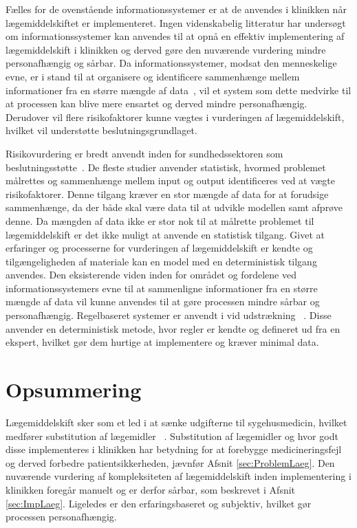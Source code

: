Fælles for de ovenstående informationssystemer er at de anvendes i klinikken når lægemiddelskiftet er implementeret. Ingen videnskabelig litteratur har undersøgt om informationssystemer kan anvendes til at opnå en effektiv implementering af lægemiddelskift i klinikken og derved gøre den nuværende vurdering mindre personafhængig og sårbar. Da informationssystemer, modsat den menneskelige evne, er i stand til at organisere og identificere sammenhænge mellem informationer fra en større mængde af data~\citep{Agrawal2009}, vil et system som dette medvirke til at processen kan blive mere ensartet og derved mindre personafhængig. Derudover vil flere risikofaktorer kunne vægtes i vurderingen af lægemiddelskift, hvilket vil understøtte beslutningsgrundlaget.  

Risikovurdering er bredt anvendt inden for sundhedssektoren som beslutningsstøtte~\citep{Geissert2018}. De fleste studier anvender statistisk, hvormed problemet målrettes og sammenhænge mellem input og output identificeres ved at vægte risikofaktorer. Denne tilgang kræver en stor mængde af data for at forudsige sammenhænge, da der både skal være data til at udvikle modellen samt afprøve denne. Da mængden af data ikke er stor nok til at målrette problemet til lægemiddelskift er det ikke muligt at anvende en statistisk tilgang. Givet at erfaringer og processerne for vurderingen af lægemiddelskift er kendte og tilgængeligheden af materiale kan en model med en deterministisk tilgang anvendes. Den eksisterende viden inden for området og fordelene ved informationssystemers evne til at sammenligne informationer fra en større mængde af data vil kunne anvendes til at gøre processen mindre sårbar og personafhængig. Regelbaseret systemer er anvendt i vid udstrækning ~\citep{}. Disse anvender en deterministisk metode, hvor regler er kendte og defineret ud fra en ekspert, hvilket gør dem hurtige at implementere og kræver minimal data. 

\section{Opsummering}
Lægemiddelskift sker som et led i at sænke udgifterne til sygehusmedicin, hvilket medfører substitution af lægemidler ~\citep{Ess2003, Johnston2011}. Substitution af lægemidler og hvor godt disse implementeres i klinikken har betydning for at forebygge medicineringsfejl og derved forbedre patientsikkerheden, jævnfør Afsnit \ref{sec:ProblemLaeg}. Den nuværende vurdering af kompleksiteten af lægemiddelskift inden implementering i klinikken foregår manuelt og er derfor sårbar, som beskrevet i Afsnit \ref{sec:ImpLaeg}. Ligeledes er den erfaringsbaseret og subjektiv, hvilket gør processen personafhængig.

